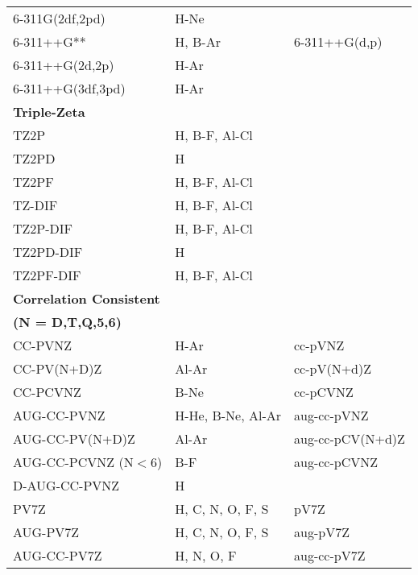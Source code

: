 \begin{table}[tbp]
\begin{center}
\begin{tabular}{|l|l|l|}
        6-311G(2df,2pd)         & H-Ne                  &\\
	6-311++G**		& H, B-Ar		&6-311++G(d,p)\\
        6-311++G(2d,2p)         & H-Ar                  &\\
        6-311++G(3df,3pd)       & H-Ar                  &\\
\hline
\hline
\textbf{Triple-Zeta} 			&				&\\	
\hline
	TZ2P			& H, B-F, Al-Cl		&\\
	TZ2PD			& H				&\\
	TZ2PF			& H, B-F, Al-Cl		&\\
	TZ-DIF			& H, B-F, Al-Cl		&\\ 	
	TZ2P-DIF		& H, B-F, Al-Cl		&\\
	TZ2PD-DIF		& H				&\\
	TZ2PF-DIF		& H, B-F, Al-Cl		&\\		
\hline
\hline
\textbf{Correlation Consistent}		&			&\\
\textbf{ (N = D,T,Q,5,6)}	&			&	\\
\hline
	CC-PVNZ			& H-Ar			&cc-pVNZ\\
	CC-PV(N+D)Z		& Al-Ar			&cc-pV(N+d)Z\\
        CC-PCVNZ                & B-Ne                  &cc-pCVNZ\\
	AUG-CC-PVNZ		& H-He, B-Ne, Al-Ar	&aug-cc-pVNZ\\
	AUG-CC-PV(N+D)Z		& Al-Ar			&aug-cc-pCV(N+d)Z\\
	AUG-CC-PCVNZ (N${<}$6)	& B-F			&aug-cc-pCVNZ\\
	D-AUG-CC-PVNZ		& H			&\\
	PV7Z			& H, C, N, O, F, S	&pV7Z\\
	AUG-PV7Z		& H, C, N, O, F, S	&aug-pV7Z\\
	AUG-CC-PV7Z             & H, N, O, F            &aug-cc-pV7Z\\
\hline
\hline
\hline
\end{tabular}
\end{center}
\end{table}

